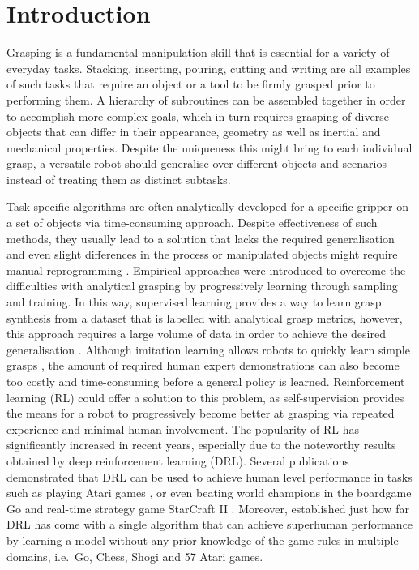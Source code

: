 \chapter{Introduction}

Grasping is a fundamental manipulation skill that is essential for a variety of everyday tasks. Stacking, inserting, pouring, cutting and writing are all examples of such tasks that require an object or a tool to be firmly grasped prior to performing them. A hierarchy of subroutines can be assembled together in order to accomplish more complex goals, which in turn requires grasping of diverse objects that can differ in their appearance, geometry as well as inertial and mechanical properties. Despite the uniqueness this might bring to each individual grasp, a versatile robot should generalise over different objects and scenarios instead of treating them as distinct subtasks.

Task-specific algorithms are often analytically developed for a specific gripper on a set of objects via time-consuming approach. Despite effectiveness of such methods, they usually lead to a solution that lacks the required generalisation and even slight differences in the process or manipulated objects might require manual reprogramming \cite{sahbani_overview_2012}. Empirical approaches were introduced to overcome the difficulties with analytical grasping by progressively learning through sampling and training. In this way, supervised learning provides a way to learn grasp synthesis from a dataset that is labelled with analytical grasp metrics, however, this approach requires a large volume of data in order to achieve the desired generalisation \cite{mahler_dex-net_2017}. Although imitation learning allows robots to quickly learn simple grasps \cite{zhang_deep_2018}, the amount of required human expert demonstrations can also become too costly and time-consuming before a general policy is learned. Reinforcement learning (RL) \cite{sutton_reinforcement_2018} could offer a solution to this problem, as self-supervision provides the means for a robot to progressively become better at grasping via repeated experience and minimal human involvement. The popularity of RL has significantly increased in recent years, especially due to the noteworthy results obtained by deep reinforcement learning (DRL). Several publications demonstrated that DRL can be used to achieve human level performance in tasks such as playing Atari games \cite{mnih_human-level_2015}, or even beating world champions in the boardgame Go \cite{silver_mastering_2017} and real-time strategy game StarCraft II \cite{vinyals_grandmaster_2019}. Moreover, \citet{schrittwieser_mastering_2020} established just how far DRL has come with a single algorithm that can achieve superhuman performance by learning a model without any prior knowledge of the game rules in multiple domains, i.e.~Go, Chess, Shogi and 57 Atari games.

